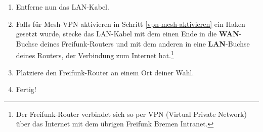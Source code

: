 \documentclass{article}
\begin{document}
\begin{enumerate}
\item Entferne nun das LAN-Kabel.


%

\item Falls für \glqq{}Mesh-VPN aktivieren\grqq{} in Schritt \ref{vpn-mesh-aktivieren} ein Haken gesetzt wurde, stecke das LAN-Kabel mit dem einen Ende in die \textbf{WAN}-Buchse deines Freifunk-Routers und mit dem anderen in eine \textbf{LAN}-Buchse deines Routers, der Verbindung zum Internet hat.\footnote{Der Freifunk-Router verbindet sich so per VPN (Virtual Private Network) über das Internet mit dem übrigen Freifunk Bremen Intranet.}

\item Platziere den Freifunk-Router an einem Ort deiner Wahl. \label{platzieren}


\item Fertig!
\end{enumerate}
\end{document}
